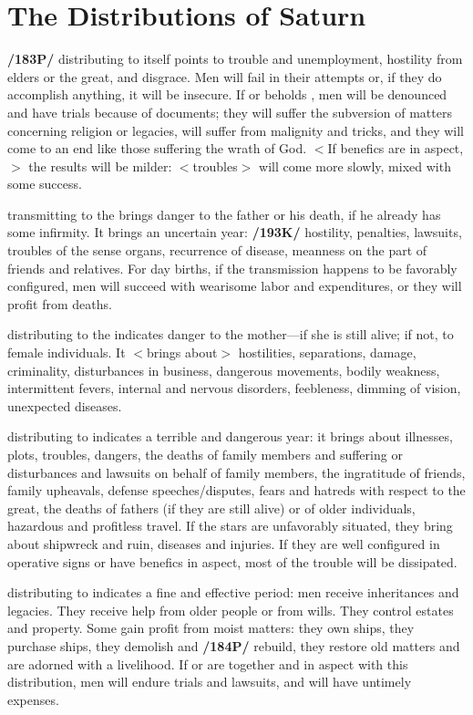 \section{The Distributions of Saturn}

\textbf{/183P/} \Saturn\xspace distributing to itself points to trouble and unemployment, hostility from elders or the great, and disgrace. Men will fail in their attempts or, if they do accomplish anything, it will be insecure. If \Mercury\xspace or \Mars\xspace beholds \Saturn, men will be denounced and have trials because of documents; they will suffer the subversion of matters concerning religion or legacies, will suffer from malignity and tricks, and they will come to an end like those suffering the wrath of God. $<$If benefics are in aspect,$>$ the results will be milder: $<$troubles$>$ will come more slowly, mixed with some success.

\Saturn\xspace transmitting to the \Sun\xspace brings danger to the father or his death, if he already has some infirmity.
It brings an uncertain year: \textbf{/193K/} hostility, penalties, lawsuits, troubles of the sense organs, recurrence of disease, meanness on the part of friends and relatives. For day births, if the transmission happens to be favorably configured, men will succeed with wearisome labor and expenditures, or they will profit from deaths. 

\Saturn\xspace distributing to the \Moon\xspace indicates danger to the mother—if she is still alive; if not, to female
individuals. It $<$brings about$>$ hostilities, separations, damage, criminality, disturbances in business, dangerous movements, bodily weakness, intermittent fevers, internal and nervous disorders, feebleness, dimming of vision, unexpected diseases.

\Saturn\xspace distributing to \Mars\xspace indicates a terrible and dangerous year: it brings about illnesses, plots,
troubles, dangers, the deaths of family members and suffering or disturbances and lawsuits on behalf of family members, the ingratitude of friends, family upheavals, defense speeches/disputes, fears and hatreds with respect to the great, the deaths of fathers (if they are still alive) or of older individuals, hazardous and profitless travel. If the stars are unfavorably situated, they bring about shipwreck and ruin, diseases and injuries. If they are well configured in operative signs or have benefics in aspect, most of the trouble will
be dissipated.

\Saturn\xspace distributing to \Jupiter\xspace indicates a fine and effective period: men receive inheritances and legacies. They receive help from older people or from wills. They control estates and property. Some gain profit from moist matters: they own ships, they purchase ships, they demolish and \textbf{/184P/} rebuild, they restore old matters and are adorned with a livelihood. If \Mars\xspace or \Mercury\xspace are together and in aspect with this distribution, men will endure trials and lawsuits, and will have untimely expenses.

